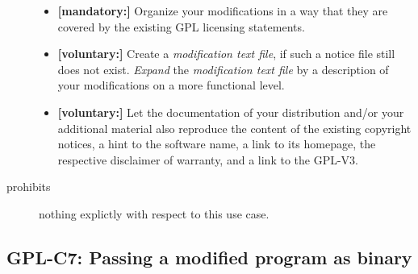 \begin{description}
\begin{itemize}
  \item \textbf{[mandatory:]} Organize your modifications in a way that they are
  covered by the existing GPL licensing statements.
  
  \item \textbf{[voluntary:]} Create a \emph{modification text file}, if such a
  notice file still does not exist. \emph{Expand} the \emph{modification text
  file} by a description of your modifications on a more functional level.
    
  \item \textbf{[voluntary:]} Let the documentation of your distribution and/or
  your additional material also reproduce the content of the existing
  copyright notices, a hint to the software name, a link to its homepage,
  the respective disclaimer of warranty, and a link to the GPL-V3.
  
 \end{itemize}
 
\item[prohibits] nothing explictly with respect to this use case.

\end{description}

\subsection{GPL-C7: Passing a modified program as binary}
\label{OSUC-04B-GPL}

